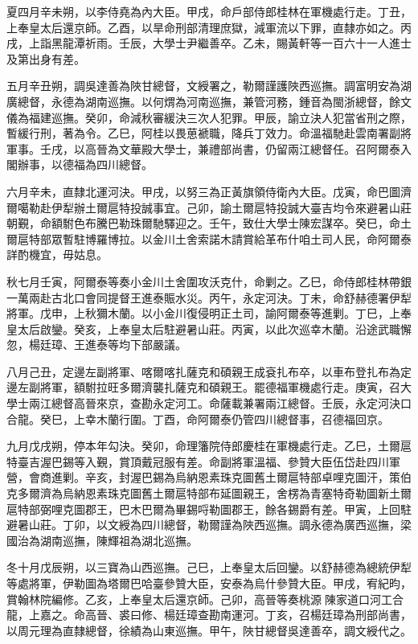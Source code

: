 \begin{pinyinscope}
夏四月辛未朔，以李侍堯為內大臣。甲戌，命戶部侍郎桂林在軍機處行走。丁丑，上奉皇太后還京師。乙酉，以旱命刑部清理庶獄，減軍流以下罪，直隸亦如之。丙戌，上詣黑龍潭祈雨。壬辰，大學士尹繼善卒。乙未，賜黃軒等一百六十一人進士及第出身有差。

五月辛丑朔，調吳達善為陜甘總督，文綬署之，勒爾謹護陜西巡撫。調富明安為湖廣總督，永德為湖南巡撫。以何煟為河南巡撫，兼管河務，鍾音為閩浙總督，餘文儀為福建巡撫。癸卯，命減秋審緩決三次人犯罪。甲辰，諭立決人犯當省刑之際，暫緩行刑，著為令。乙巳，阿桂以畏葸褫職，降兵丁效力。命溫福馳赴雲南署副將軍事。壬戌，以高晉為文華殿大學士，兼禮部尚書，仍留兩江總督任。召阿爾泰入閣辦事，以德福為四川總督。

六月辛未，直隸北運河決。甲戌，以努三為正黃旗領侍衛內大臣。戊寅，命巴圖濟爾噶勒赴伊犁辦土爾扈特投誠事宜。己卯，諭土爾扈特投誠大臺吉均令來避暑山莊朝覲，命額駙色布騰巴勒珠爾馳驛迎之。壬午，致仕大學士陳宏謀卒。癸巳，命土爾扈特部眾暫駐博羅博拉。以金川土舍索諾木請賞給革布什咱土司人民，命阿爾泰詳酌機宜，毋姑息。

秋七月壬寅，阿爾泰等奏小金川土舍圍攻沃克什，命剿之。乙巳，命侍郎桂林帶銀一萬兩赴古北口會同提督王進泰賑水災。丙午，永定河決。丁未，命舒赫德署伊犁將軍。戊申，上秋獮木蘭。以小金川復侵明正土司，諭阿爾泰等進剿。丁巳，上奉皇太后啟鑾。癸亥，上奉皇太后駐避暑山莊。丙寅，以此次巡幸木蘭。沿途武職懈忽，楊廷璋、王進泰等均下部嚴議。

八月己丑，定邊左副將軍、喀爾喀扎薩克和碩親王成袞扎布卒，以車布登扎布為定邊左副將軍，額駙拉旺多爾濟襲扎薩克和碩親王。罷德福軍機處行走。庚寅，召大學士兩江總督高晉來京，查勘永定河工。命薩載兼署兩江總督。壬辰，永定河決口合龍。癸巳，上幸木蘭行圍。丁酉，命阿爾泰仍管四川總督事，召德福回京。

九月戊戌朔，停本年勾決。癸卯，命理籓院侍郎慶桂在軍機處行走。乙巳，土爾扈特臺吉渥巴錫等入覲，賞頂戴冠服有差。命副將軍溫福、參贊大臣伍岱赴四川軍營，會商進剿。辛亥，封渥巴錫為烏納恩素珠克圖舊土爾扈特部卓哩克圖汗，策伯克多爾濟為烏納恩素珠克圖舊土爾扈特部布延圖親王，舍楞為青塞特奇勒圖新土爾扈特部弼哩克圖郡王，巴木巴爾為畢錫哷勒圖郡王，餘各錫爵有差。甲寅，上回駐避暑山莊。丁卯，以文綬為四川總督，勒爾謹為陜西巡撫。調永德為廣西巡撫，梁國治為湖南巡撫，陳輝祖為湖北巡撫。

冬十月戊辰朔，以三寶為山西巡撫。己巳，上奉皇太后回鑾。以舒赫德為總統伊犁等處將軍，伊勒圖為塔爾巴哈臺參贊大臣，安泰為烏什參贊大臣。甲戌，宥紀昀，賞翰林院編修。乙亥，上奉皇太后還京師。己卯，高晉等奏桃源陳家道口河工合龍，上嘉之。命高晉、裘曰修、楊廷璋查勘南運河。丁亥，召楊廷璋為刑部尚書，以周元理為直隸總督，徐績為山東巡撫。甲午，陜甘總督吳達善卒，調文綬代之。


\end{pinyinscope}
